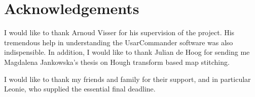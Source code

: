 \chapter*{Acknowledgements}

I would like to thank Arnoud Visser for his supervision of the project. His tremendous help in understanding the UsarCommander software was also indispensible.  In addition, I would like to thank Julian de Hoog for sending me Magdalena Jankowska's thesis on Hough transform based map stitching.

I would like to thank my friends and family for their support, and in particular Leonie, who supplied the essential final deadline.